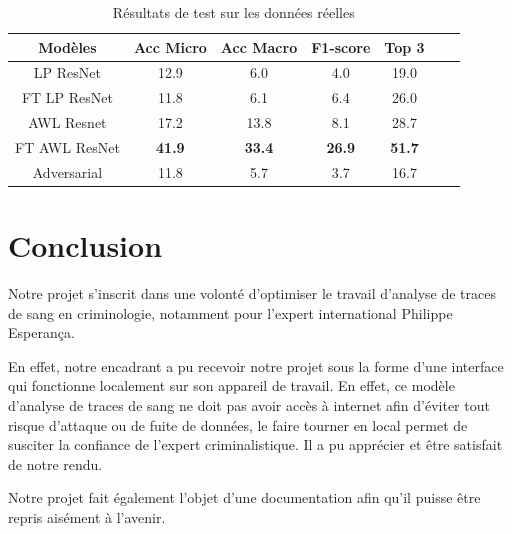 \documentclass[a4paper]{article}
\begin{document}
\begin{table}[ht]
  \centering
    \begin{tabular}{ccccccc}
    \toprule
    Modèles & Acc Micro & Acc Macro & F1-score & Top 3 \\
    \midrule
    LP ResNet & 12.9 & 6.0 & 4.0 & 19.0 \\
    FT LP ResNet & 11.8 & 6.1 & 6.4 & 26.0 \\
    AWL Resnet & 17.2 & 13.8 & 8.1 & 28.7 \\
    FT AWL ResNet & \textbf{41.9} & \textbf{33.4} & \textbf{26.9} & \textbf{51.7} \\
    Adversarial & 11.8 & 5.7 & 3.7 & 16.7 \\
    \bottomrule
    \end{tabular}
  \label{tab: results_real}
   \caption{Résultats de test sur les données réelles}
\end{table}

\section{Conclusion}

Notre projet s'inscrit dans une volonté d'optimiser le travail d'analyse de traces de sang en criminologie, notamment pour l'expert international Philippe Esperança. 

En effet, notre encadrant a pu recevoir notre projet sous la forme d'une interface qui fonctionne localement sur son appareil de travail. En effet, ce modèle d'analyse de traces de sang ne doit pas avoir accès à internet afin d'éviter tout risque d'attaque ou de fuite de données, le faire tourner en local permet de susciter la confiance de l'expert criminalistique. Il a pu apprécier et être satisfait de notre rendu.

Notre projet fait également l'objet d'une documentation afin qu'il puisse être repris aisément à l'avenir. 

\printbibliography
\end{document}
